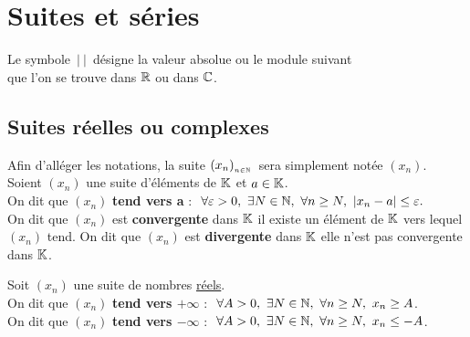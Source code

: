 \section{Suites et séries}

\vspace{1cm}

\begin{center}
    Le symbole $\,\lvert\ \rvert\,$ désigne la valeur absolue ou le module suivant\\
    que l'on se trouve dans \(\mathbb{R}\) ou dans \(\mathbb{C}\).
\end{center}

\vspace{0.5cm}

\subsection{Suites réelles ou complexes}

\vspace{1.3cm}

\hspace{0.5cm} Afin d'alléger les notations, la suite $\displaystyle(x_n)_{_{n\in \mathbb{N}}}\,$ sera simplement notée $(x_n)$.\vspace{0.3cm}\\

Soient \((x_n)\) une suite d'éléments de $\mathbb{K}$ et \(a\in \mathbb{K}\).\\
On dit que $(x_n)$ \textbf{tend vers a} \ssi :\(\ \ \forall \varepsilon >0,\ \exists N\in \mathbb{N},\ \forall n\geq N,\ |x_n-a|\leq \varepsilon. \)\vspace{0.3cm}\\
On dit que $(x_n)$ est \textbf{convergente} dans $\mathbb{K}$ \ssi il existe un élément de $\mathbb{K}$ vers lequel $(x_n)$ tend. On dit que $(x_n)$ est \textbf{divergente} dans $\mathbb{K}$ \ssi elle n'est pas convergente dans $\mathbb{K}$.

\vspace{1.3cm}

Soit $(x_n)$ une suite de nombres \underline{réels}.\\
On dit que $(x_n)$ \textbf{tend vers $+\infty$} \ssi :\(\ \ \forall A>0,\ \exists N\in \NN,\ \forall n\geq N,\ x_n\geq A\).\vspace{0.1cm}\\
On dit que $(x_n)$ \textbf{tend vers $-\infty$} \ssi :\(\ \ \forall A>0,\ \exists N\in \NN,\ \forall n\geq N,\ x_n\leq -A\).

